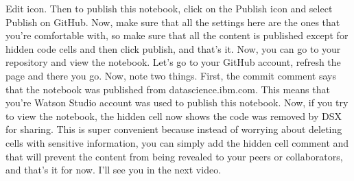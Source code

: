 Edit icon. Then to publish this notebook, click on the Publish icon and select Publish on GitHub. Now, make sure that all the settings here are the ones that you're comfortable with, so make sure that all the content is published except for hidden code cells and then click publish, and that's it. Now, you can go to your repository and view the notebook. Let's go to your GitHub account, refresh the page and there you go. Now, note two things. First, the commit comment says that the notebook was published from datascience.ibm.com. This means that you're Watson Studio account was used to publish this notebook. Now, if you try to view the notebook, the hidden cell now shows the code was removed by DSX for sharing. This is super convenient because instead of worrying about deleting cells with sensitive information, you can simply add the hidden cell comment and that will prevent the content from being revealed to your peers or collaborators, and that's it for now. I'll see you in the next video.